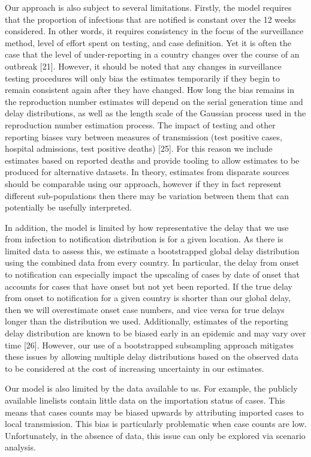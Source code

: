 \documentclass[
]{article}
\begin{document}
Our approach is also subject to several limitations. Firstly, the model
requires that the proportion of infections that are notified is constant
over the 12 weeks considered. In other words, it requires consistency in
the focus of the surveillance method, level of effort spent on testing,
and case definition. Yet it is often the case that the level of
under-reporting in a country changes over the course of an outbreak
{[}21{]}. However, it should be noted that any changes in surveillance
testing procedures will only bias the estimates temporarily if they
begin to remain consistent again after they have changed. How long the
bias remains in the reproduction number estimates will depend on the
serial generation time and delay distributions, as well as the length
scale of the Gaussian process used in the reproduction number estimation
process. The impact of testing and other reporting biases vary between
measures of transmission (test positive cases, hospital admissions, test
positive deaths) {[}25{]}. For this reason we include estimates based on
reported deaths and provide tooling to allow estimates to be produced
for alternative datasets. In theory, estimates from disparate sources
should be comparable using our approach, however if they in fact
represent different sub-populations then there may be variation between
them that can potentially be usefully interpreted.

In addition, the model is limited by how representative the delay that
we use from infection to notification distribution is for a given
location. As there is limited data to assess this, we estimate a
bootstrapped global delay distribution using the combined data from
every country. In particular, the delay from onset to notification can
especially impact the upscaling of cases by date of onset that accounts
for cases that have onset but not yet been reported. If the true delay
from onset to notification for a given country is shorter than our
global delay, then we will overestimate onset case numbers, and vice
versa for true delays longer than the distribution we used.
Additionally, estimates of the reporting delay distribution are known to
be biased early in an epidemic and may vary over time {[}26{]}. However,
our use of a bootstrapped subsampling approach mitigates these issues by
allowing multiple delay distributions based on the observed data to be
considered at the cost of increasing uncertainty in our estimates.

Our model is also limited by the data available to us. For example, the
publicly available linelists contain little data on the importation
status of cases. This means that cases counts may be biased upwards by
attributing imported cases to local transmission. This bias is
particularly problematic when case counts are low. Unfortunately, in the
absence of data, this issue can only be explored via scenario analysis.
\end{document}
